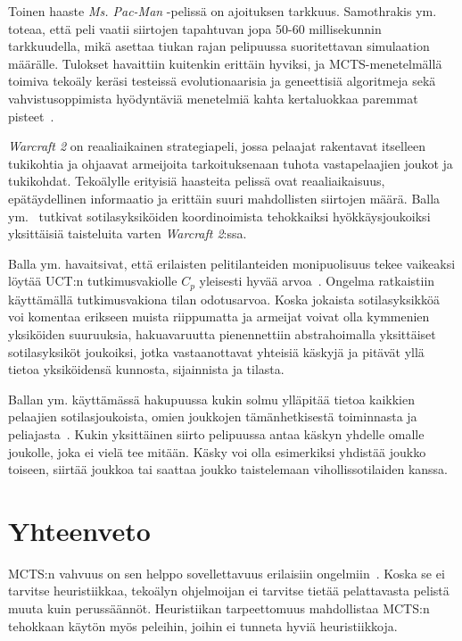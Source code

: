 \documentclass[12pt,finnish]{tktltiki2}
\theoremstyle{definition}
\theoremstyle{remark}
\begin{document}
Toinen haaste \textit{Ms. Pac-Man} -pelissä on ajoituksen tarkkuus. Samothrakis ym. toteaa, että peli vaatii siirtojen tapahtuvan jopa 50-60 millisekunnin tarkkuudella, mikä asettaa tiukan rajan pelipuussa suoritettavan simulaation määrälle. Tulokset havaittiin kuitenkin erittäin hyviksi, ja MCTS-menetelmällä toimiva tekoäly keräsi testeissä evolutionaarisia ja geneettisiä algoritmeja sekä vahvistusoppimista hyödyntäviä menetelmiä kahta kertaluokkaa paremmat pisteet~\cite{samothrakis}.

\textit{Warcraft 2} on reaaliaikainen strategiapeli, jossa pelaajat rakentavat itselleen tukikohtia ja ohjaavat armeijoita tarkoituksenaan tuhota vastapelaajien joukot ja tukikohdat. Tekoälylle erityisiä haasteita pelissä ovat reaaliaikaisuus, epätäydellinen informaatio ja erittäin suuri mahdollisten siirtojen määrä. Balla ym.~\cite{balla} tutkivat sotilasyksiköiden koordinoimista tehokkaiksi hyökkäysjoukoiksi yksittäisiä taisteluita varten \textit{Warcraft 2}:ssa.

Balla ym. havaitsivat, että erilaisten pelitilanteiden monipuolisuus tekee vaikeaksi löytää UCT:n tutkimusvakiolle $C_p$ yleisesti hyvää arvoa~\cite{balla}. Ongelma ratkaistiin käyttämällä tutkimusvakiona tilan odotusarvoa. Koska jokaista sotilasyksikköä voi komentaa erikseen muista riippumatta ja armeijat voivat olla kymmenien yksiköiden suuruuksia, hakuavaruutta pienennettiin abstrahoimalla yksittäiset sotilasyksiköt joukoiksi, jotka vastaanottavat yhteisiä käskyjä ja pitävät yllä tietoa yksiköidensä kunnosta, sijainnista ja tilasta.

Ballan ym. käyttämässä hakupuussa kukin solmu ylläpitää tietoa kaikkien pelaajien sotilasjoukoista, omien joukkojen tämänhetkisestä toiminnasta ja peliajasta~\cite{balla}. Kukin yksittäinen siirto pelipuussa antaa käskyn yhdelle omalle joukolle, joka ei vielä tee mitään. Käsky voi olla esimerkiksi yhdistää joukko toiseen, siirtää joukkoa tai saattaa joukko taistelemaan vihollissotilaiden kanssa.

\section{Yhteenveto}

MCTS:n vahvuus on sen helppo sovellettavuus erilaisiin ongelmiin~\cite{browne}. Koska se ei tarvitse heuristiikkaa, tekoälyn ohjelmoijan ei tarvitse tietää pelattavasta pelistä muuta kuin perussäännöt. Heuristiikan tarpeettomuus mahdollistaa MCTS:n tehokkaan käytön myös peleihin, joihin ei tunneta hyviä heuristiikkoja.
\end{document}
